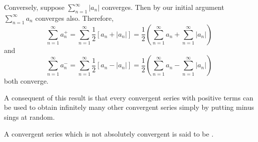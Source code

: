 \documentclass[12pt]{report}
\begin{document}
\begin{proof*}{}{}
    Conversely, suppose $\sum\limits_{n=1}^{\infty}|a_n|$ converges. Then by our initial argument $\sum\limits_{n=1}^{\infty}a_n$ converges also. Therefore, \begin{equation*}
        \sum\limits_{n=1}^{\infty}a_n^+ = \sum\limits_{n=1}^{\infty}\frac{1}{2}[a_n + |a_n|] = \frac{1}{2}\left(\sum\limits_{n=1}^{\infty}a_n + \sum\limits_{n=1}^{\infty}|a_n|\right)
    \end{equation*}
    and  \begin{equation*}
        \sum\limits_{n=1}^{\infty}a_n^- = \sum\limits_{n=1}^{\infty}\frac{1}{2}[a_n - |a_n|] = \frac{1}{2}\left(\sum\limits_{n=1}^{\infty}a_n - \sum\limits_{n=1}^{\infty}|a_n|\right)
    \end{equation*}
    both converge.
\end{proof*}



\begin{rmk}{}{}
    A consequent of this result is that every convergent series with positive terms can be used to obtain infinitely many other convergent series simply by putting minus sings at random.
\end{rmk}

\begin{defn}{}{}
    A convergent series which is not absolutely convergent is said to be .
\end{defn}
\end{document}
